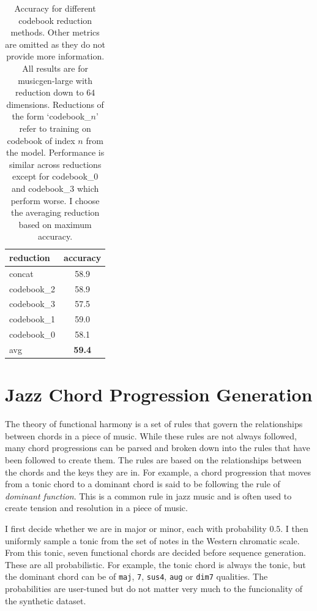 \begin{table}[H]
    \centering
    \begin{tabular}{lc}
        \toprule
        reduction   & accuracy \\  
        \midrule
        concat       & 58.9     \\
        codebook\_2  & 58.9     \\
        codebook\_3  & 57.5     \\
        codebook\_1  & 59.0     \\
        codebook\_0  & 58.1     \\
        avg          & \textbf{59.4}     \\
        \bottomrule
    \end{tabular}
    \caption{Accuracy for different codebook reduction methods. Other metrics are omitted as they do not provide more information. All results are for musicgen-large with reduction down to $64$ dimensions. Reductions of the form `codebook\_$n$' refer to training on codebook of index $n$ from the model. Performance is similar across reductions except for codebook\_0 and codebook\_3 which perform worse. I choose the averaging reduction based on maximum accuracy. }\label{tab:reduction_accuracy}
\end{table}

\section{Jazz Chord Progression Generation}\label{app:jazz_chord_progression_generation}

The theory of functional harmony is a set of rules that govern the relationships between chords in a piece of music. While these rules are not always followed, many chord progressions can be parsed and broken down into the rules that have been followed to create them. The rules are based on the relationships between the chords and the keys they are in. For example, a chord progression that moves from a tonic chord to a dominant chord is said to be following the rule of \emph{dominant function}. This is a common rule in jazz music and is often used to create tension and resolution in a piece of music.

I first decide whether we are in major or minor, each with probability $0.5$. I then uniformly sample a tonic from the set of notes in the Western chromatic scale. From this tonic, seven functional chords are decided before sequence generation. These are all probabilistic. For example, the tonic chord is always the tonic, but the dominant chord can be of \texttt{maj}, \texttt{7}, \texttt{sus4}, \texttt{aug} or \texttt{dim7} qualities. The probabilities are user-tuned but do not matter very much to the funcionality of the synthetic dataset. 

